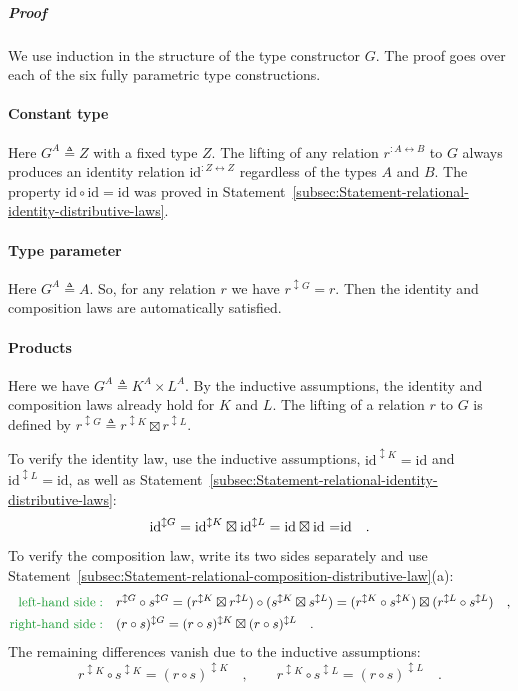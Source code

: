 \subparagraph{Proof}

We use induction in the structure of the type constructor $G$. The
proof goes over each of the six fully parametric type constructions.

\paragraph{Constant type}

Here $G^{A}\triangleq Z$ with a fixed type $Z$. The lifting of any
relation $r^{:A\leftrightarrow B}$ to $G$ always produces an identity
relation $\text{id}^{:Z\leftrightarrow Z}$ regardless of the types
$A$ and $B$. The property $\text{id}\circ\text{id}=\text{id}$ was
proved in Statement~\ref{subsec:Statement-relational-identity-distributive-laws}.

\paragraph{Type parameter}

Here $G^{A}\triangleq A$. So, for any relation $r$ we have $r^{\updownarrow G}=r$.
Then the identity and composition laws are automatically satisfied.

\paragraph{Products}

Here we have $G^{A}\triangleq K^{A}\times L^{A}$. By the inductive
assumptions, the identity and composition laws already hold for $K$
and $L$. The lifting of a relation $r$ to $G$ is defined by $r^{\updownarrow G}\triangleq r^{\updownarrow K}\boxtimes r^{\updownarrow L}$. 

To verify the identity law, use the inductive assumptions, $\text{id}^{\updownarrow K}=\text{id}$
and $\text{id}^{\updownarrow L}=\text{id}$, as well as Statement~\ref{subsec:Statement-relational-identity-distributive-laws}:
\[
\text{id}^{\updownarrow G}=\text{id}^{\updownarrow K}\boxtimes\text{id}^{\updownarrow L}=\text{id}\boxtimes\text{id =}\text{\text{id}}\quad.
\]

To verify the composition law, write its two sides separately and
use Statement~\ref{subsec:Statement-relational-composition-distributive-law}(a):
\begin{align*}
{\color{greenunder}\text{left-hand side}:}\quad & r^{\updownarrow G}\circ s^{\updownarrow G}=(r^{\updownarrow K}\boxtimes r^{\updownarrow L})\circ(s^{\updownarrow K}\boxtimes s^{\updownarrow L})=(r^{\updownarrow K}\circ s^{\updownarrow K})\boxtimes(r^{\updownarrow L}\circ s^{\updownarrow L})\quad,\\
{\color{greenunder}\text{right-hand side}:}\quad & (r\circ s)^{\updownarrow G}=(r\circ s)^{\updownarrow K}\boxtimes(r\circ s)^{\updownarrow L}\quad.
\end{align*}
The remaining differences vanish due to the inductive assumptions:
\[
r^{\updownarrow K}\circ s^{\updownarrow K}=(r\circ s)^{\updownarrow K}\quad,\quad\quad r^{\updownarrow K}\circ s^{\updownarrow L}=(r\circ s)^{\updownarrow L}\quad.
\]


